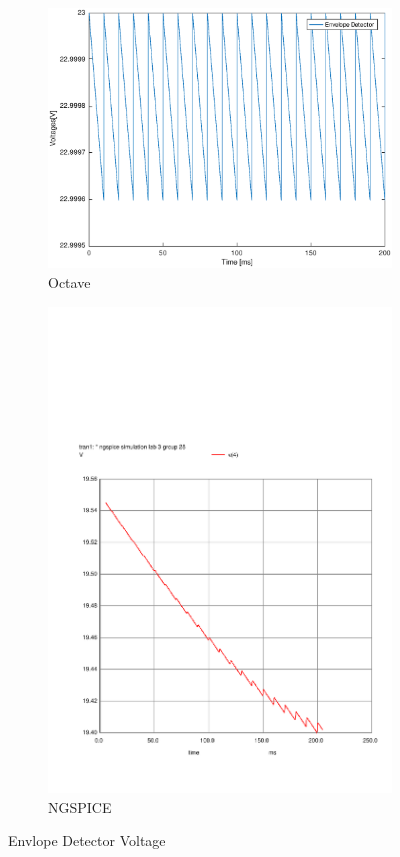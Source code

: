 \begin{figure}[H] 
\centering
\begin{subfigure}{0.4\textwidth}
\includegraphics[width=\textwidth]{EnvelopeDetector.eps}
\caption{Octave}
\label{fig:first}
\end{subfigure}
\begin{subfigure}{0.3\textwidth}
\includegraphics[width=\textwidth]{sim32.pdf}
\caption{NGSPICE}
\label{fig:second}
\end{subfigure}
\caption{Envlope Detector Voltage}
\end{figure}

